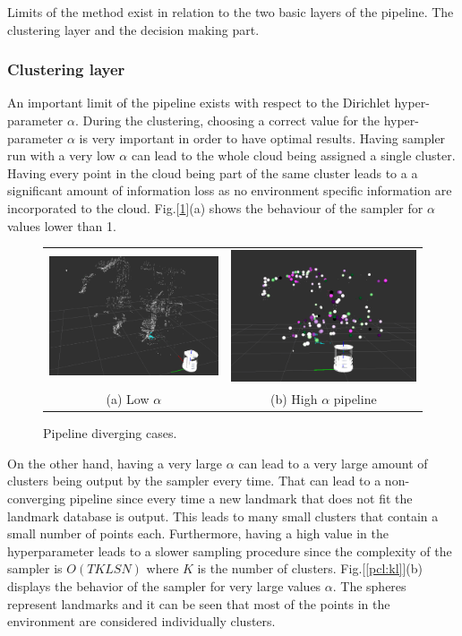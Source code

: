 \documentclass[]{article}
\begin{document}
    Limits of the method exist in relation to the two basic layers of the pipeline. The clustering layer and the decision making part.

    \subsubsection{Clustering layer}

    An important limit of the pipeline exists with respect to the Dirichlet hyper-parameter $\alpha$. During the clustering, choosing a correct value for the hyper-parameter $\alpha$ is very important in order to have optimal results. Having sampler run with a very low $\alpha$ can lead to the whole cloud being assigned a single cluster. Having every point in the cloud being part of the same cluster leads to a a significant amount of information loss as no environment specific information are incorporated to the cloud. Fig.[\ref{pip:limits}](a) shows the behaviour of the sampler for $\alpha$ values lower than 1. 

    \begin{figure}
        \begin{tabular}{cc}
            \includegraphics[width=.26\textwidth]{singlecluster} &  \includegraphics[width=.26\textwidth]{onlyclusters2} \\
            (a) Low $\alpha$ & (b) High $\alpha$ pipeline\\
        \end{tabular}
        \caption{Pipeline diverging cases.}
        \label{pip:limits}
    \end{figure}


    On the other hand, having a very large $\alpha$ can lead to a very large amount of clusters being output by the sampler every time. That can lead to a non-converging pipeline since every time a new landmark that does not fit the landmark database is output. This leads to many small clusters that contain a small number of points each. Furthermore, having a high value in the hyperparameter leads to a slower sampling procedure since the complexity of the sampler is $O(TKLSN)$ where $K$ is the number of clusters. Fig.[\ref{pcl:kl}](b) displays the behavior of the sampler for very large values $\alpha$. The spheres represent landmarks and it can be seen that most of the points in the environment are considered individually clusters.
\end{document}
